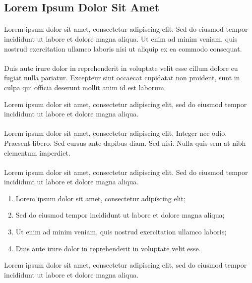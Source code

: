 \subsection*{Lorem Ipsum Dolor Sit Amet}

\paragraph{}
Lorem ipsum dolor sit amet, consectetur adipiscing elit. Sed do eiusmod tempor incididunt ut labore et dolore magna aliqua. Ut enim ad minim veniam, quis nostrud exercitation ullamco laboris nisi ut aliquip ex ea commodo consequat.

\paragraph{}
Duis aute irure dolor in reprehenderit in voluptate velit esse cillum dolore eu fugiat nulla pariatur. Excepteur sint occaecat cupidatat non proident, sunt in culpa qui officia deserunt mollit anim id est laborum.

\;

Lorem ipsum dolor sit amet, consectetur adipiscing elit, sed do eiusmod tempor incididunt ut labore et dolore magna aliqua.

\paragraph{}
Lorem ipsum dolor sit amet, consectetur adipiscing elit. Integer nec odio. Praesent libero. Sed cursus ante dapibus diam. Sed nisi. Nulla quis sem at nibh elementum imperdiet.

\paragraph{}
Lorem ipsum dolor sit amet, consectetur adipiscing elit. Sed do eiusmod tempor incididunt ut labore et dolore magna aliqua.  
\begin{enumerate}
\item Lorem ipsum dolor sit amet, consectetur adipiscing elit;
\item Sed do eiusmod tempor incididunt ut labore et dolore magna aliqua;
\item Ut enim ad minim veniam, quis nostrud exercitation ullamco laboris;
\item Duis aute irure dolor in reprehenderit in voluptate velit esse.
\end{enumerate}
Lorem ipsum dolor sit amet, consectetur adipiscing elit, sed do eiusmod tempor incididunt ut labore et dolore magna aliqua.

